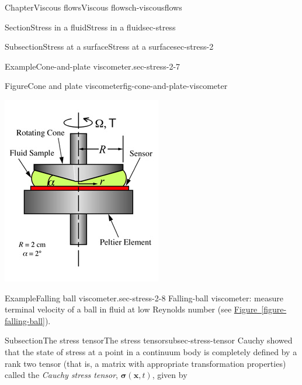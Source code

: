 \documentclass[oneside,10pt,]{book}
\newcommand{\xreffont}{\relax}
\numberwithin{equation}{section}
\newcommand{\bx}{\boldsymbol{x}}
\newcommand{\bsigma}{\boldsymbol{\sigma}}
\begin{document}
\begin{chapterptx}{Chapter}{Viscous flows}{}{Viscous flows}{}{}{ch-viscousflows}
\begin{sectionptx}{Section}{Stress in a fluid}{}{Stress in a fluid}{}{}{sec-stress}
\begin{subsectionptx}{Subsection}{Stress at a surface}{}{Stress at a surface}{}{}{sec-stress-2}
\begin{example}{Example}{Cone-and-plate viscometer.}{sec-stress-2-7}
\begin{figureptx}{Figure}{Cone and plate viscometer}{fig-cone-and-plate-viscometer}{}
\begin{image}{0.25}{0.5}{0.25}{}
\includegraphics[width=\linewidth]{external/ch-chapter07-Cone_and_plate.jpg}
\end{image}%
\tcblower
\end{figureptx}%
\end{example}
\begin{example}{Example}{Falling ball viscometer.}{sec-stress-2-8}%
Falling-ball viscometer: measure terminal velocity of a ball in fluid at low Reynolds number (see \hyperref[figure-falling-ball]{Figure~{\xreffont\ref{figure-falling-ball}}}).%
\end{example}
\end{subsectionptx}
%
%
\typeout{************************************************}
\typeout{************************************************}
%
\begin{subsectionptx}{Subsection}{The stress tensor}{}{The stress tensor}{}{}{subsec-stress-tensor}
Cauchy showed that the state of stress at a point in a continuum body is completely defined by a rank two tensor (that is, a matrix with appropriate transformation properties) called the \emph{Cauchy stress tensor}, \(\bsigma(\bx,t)\), given by%

\end{subsectionptx}
\end{sectionptx}
\end{chapterptx}
\end{document}
